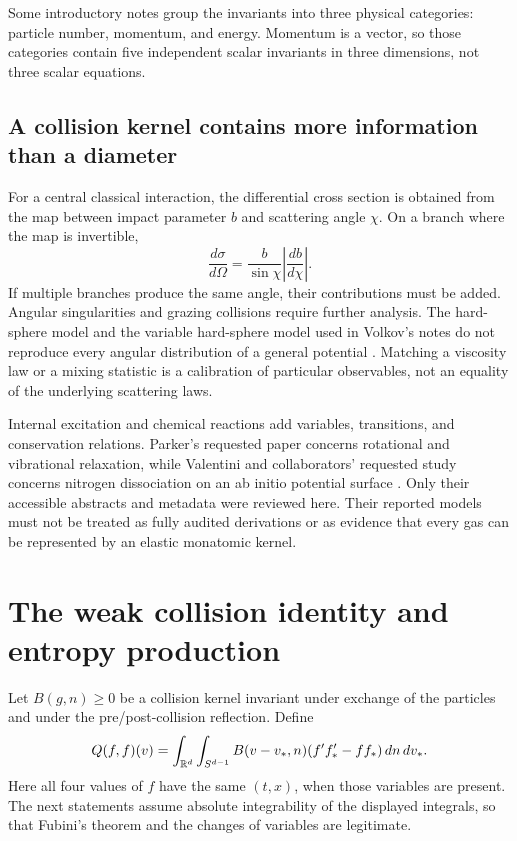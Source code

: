 Some introductory notes group the invariants into three physical
categories: particle number, momentum, and energy.  Momentum is a vector,
so those categories contain five independent scalar invariants in
three dimensions, not three scalar equations.

\subsection{A collision kernel contains more information than a diameter}

For a central classical interaction, the differential cross section is
obtained from the map between impact parameter $b$ and scattering
angle $\chi$.  On a branch where the map is invertible,
\[
 \frac{d\sigma}{d\Omega}
 =\frac{b}{\sin\chi}\left|\frac{db}{d\chi}\right|.
\]
If multiple branches produce the same angle, their contributions must
be added.  Angular singularities and grazing collisions require further
analysis.  The hard-sphere model and the variable hard-sphere model
used in Volkov's notes do not reproduce every angular distribution of
a general potential \citep{microVolkov02}.  Matching a viscosity
law or a mixing statistic is a calibration of particular observables,
not an equality of the underlying scattering laws.

Internal excitation and chemical reactions add variables, transitions,
and conservation relations.  Parker's requested paper concerns
rotational and vibrational relaxation, while Valentini and collaborators'
requested study concerns nitrogen dissociation on an ab initio potential
surface \citep{microParker1959,microValentini2015}.  Only their
accessible abstracts and metadata were reviewed here.  Their reported
models must not be treated as fully audited derivations or as evidence
that every gas can be represented by an elastic monatomic kernel.

\section{The weak collision identity and entropy production}

Let $B(g,n)\ge0$ be a collision kernel invariant under exchange of the
particles and under the pre/post-collision reflection.  Define
\begin{equation}
 Q(f,f)(v)=\int_{\mathbb{R}^d}\int_{S^{d-1}}
       B(v-v_*,n)(f'f_*'-ff_*)\,dn\,dv_*.
 \label{eq:micro-boltzmann-Q}
\end{equation}
Here all four values of $f$ have the same $(t,x)$, when those
variables are present.  The next statements assume absolute
integrability of the displayed integrals, so that Fubini's theorem
and the changes of variables are legitimate.


